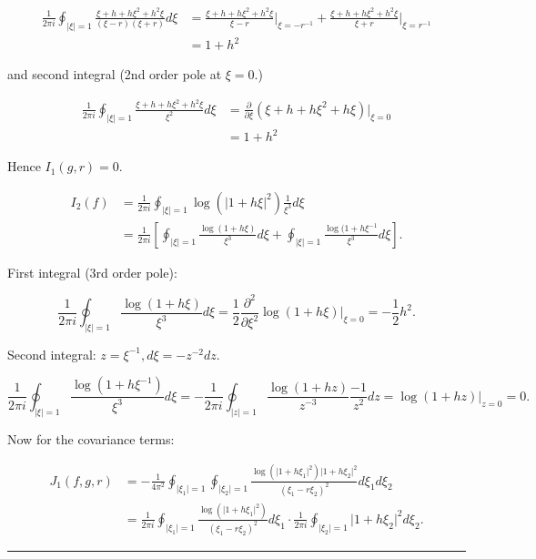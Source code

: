 \documentclass[twoside]{article}
\newenvironment{proof}{{\bf Proof:}}{\hfill\rule{2mm}{2mm}}
\begin{document}
\begin{proof}
	\begin{equation}
		\begin{split}
			\frac{1}{2\pi i }\oint_{\lvert\xi\rvert = 1}\frac{\xi+h+h\xi^2+h^2\xi}{(\xi-r)(\xi+r)}d\xi&=\frac{\xi+h+h\xi^2+h^2\xi}{\xi-r}\Bigg\lvert_{\xi=-r^{-1}}+\frac{\xi+h+h\xi^2+h^2\xi}{\xi+r}\Bigg\lvert_{\xi=r^{-1}}\\
			&=1+h^2
		\end{split}
	\end{equation}
	
	and second integral (2nd order pole at $\xi=0$.)
	
	\begin{equation}
		\begin{split}
			\frac{1}{2\pi i}\oint_{\lvert\xi\rvert=1}\frac{\xi+h+h\xi^2+h^2\xi}{\xi^2}d\xi&=\frac{\partial}{\partial \xi}(\xi+h+h\xi^2+h\xi)\Bigg\lvert_{\xi=0}\\
			&=1+h^2
		\end{split}
	\end{equation}
	
	Hence $I_1(g,r)=0$.
	
	\begin{equation}
		\begin{split}
			I_2(f)&=\frac{1}{2\pi i}\oint_{\lvert\xi\rvert=1}\log(\lvert1+h\xi\rvert^2)\frac{1}{\xi^3}d\xi\\
			&=\frac{1}{2\pi i}\left[\oint_{\lvert\xi\rvert=1}\frac{\log(1+h\xi)}{\xi^3}d\xi+\oint_{\lvert\xi\rvert=1}\frac{\log(1+h\xi^{-1}}{\xi^3}d\xi\right].
		\end{split}
	\end{equation}
	
	First integral (3rd order pole):
	
	$$\frac{1}{2\pi i }\oint_{\lvert \xi\rvert = 1}\frac{\log(1+h\xi)}{\xi^3}d\xi=\frac12\frac{\partial^2}{\partial\xi^2}\log(1+h\xi)\Bigg\lvert_{\xi=0}=-\frac{1}{2}h^2.$$
	
	Second integral: $z=\xi^{-1},d\xi=-z^{-2}dz.$
	
	$$\frac{1}{2\pi i}\oint_{\lvert\xi\rvert=1}\frac{\log(1+h\xi^{-1})}{\xi^3}d\xi=-\frac{1}{2\pi i}\oint_{\lvert z\rvert=1}\frac{\log(1+hz)}{z^{-3}}\frac{-1}{z^2}dz=\log(1+hz)\Bigg\rvert_{z=0}=0.$$
	
	Now for the covariance terms:
	
	\begin{equation}
		\begin{split}
			J_1(f,g,r)&=-\frac{1}{4\pi^2}\oint_{\lvert\xi_1\rvert=1}\oint_{\lvert\xi_2\rvert=1}\frac{\log(\lvert1+h\xi_1\rvert^2)\lvert1+h\xi_2\rvert^2}{(\xi_1-r\xi_2)^2}d\xi_1d\xi_2\\
			&=\frac{1}{2\pi i}\oint_{\lvert\xi_1\rvert=1}\frac{\log(\lvert 1+h\xi_1\rvert^2)}{(\xi_1-r\xi_2)^2}d\xi_1\cdot \frac{1}{2\pi i}\oint_{\lvert\xi_2\rvert=1}\lvert 1+h\xi_2\rvert^2d\xi_2.
		\end{split}
	\end{equation}
	

\end{proof}
\end{document}
